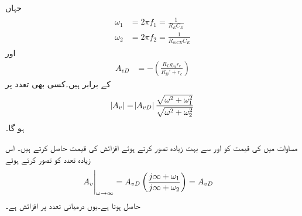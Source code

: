 جہاں
\begin{gather} \label{مساوات_تعددی_ردعمل_مخارج_کپیسٹر_انقطاعی_تعدد}
\begin{aligned}
\omega_1&=2 \pi f_1=\frac{1}{R_E C_E}\\  
\omega_2&=2 \pi f_2=\frac{1}{R_{mCE}C_E}
\end{aligned}
\end{gather}
اور
\begin{align}\label{مساوات_تعددی_ردعمل_مخارج_کپیسٹر_درمیانی_تعدد_افزائش}
A_{vD}&=-\left(\frac{R_L g_m r_e}{R_B'+r_e}\right)
\end{align}
کے برابر ہیں۔کسی بھی تعدد   پر
\begin{align}
\abs{A_v}=\abs{A_{vD}} \frac{\sqrt{\omega^2+\omega_1^2}}{\sqrt{\omega^2+\omega_2^2}}
\end{align}
ہو گا۔

مساوات  میں  کی قیمت کو  اور  سے بہت زیادہ تصور کرتے ہوئے افزائش کی قیمت  حاصل کرتے ہیں۔  اس زیادہ تعدد کو    تصور کرتے ہوئے
\begin{gather} \label{مساوات_تعددی_ردعمل_مخارج_کپیسٹر_لامحدود_تعدد}
\begin{aligned}
\eval{A_{v}}_{\omega \to \infty}&=A_{vD} \left(\frac{j \infty+\omega_1}{j \infty+\omega_2} \right ) =A_{vD}
\end{aligned}
\end{gather}
حاصل ہوتا ہے۔یوں  درمیانی تعدد پر افزائش ہے۔

